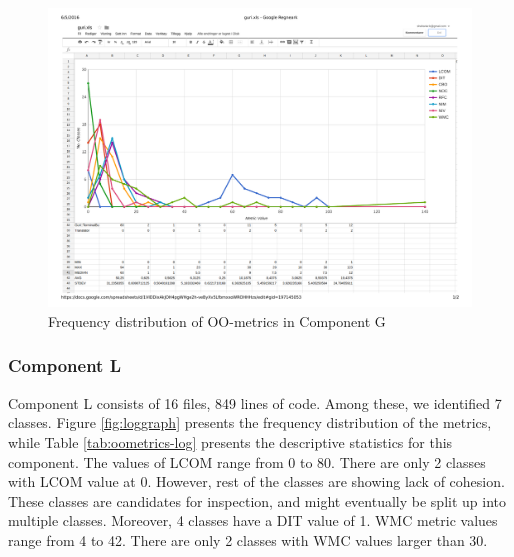 \begin{landscape}
\setlength\LTleft{-.5in}
	\begin{figure}
	\centering
	\includegraphics[width=\textwidth]{images/pdf/guri.pdf}
	\caption{Frequency distribution of OO-metrics in Component G}
	\label{fig:gurigraph}
	\end{figure}
\end{landscape}





\subsubsection{Component L}
Component L consists of 16 files, 849 lines of code. Among these, we identified 7 classes. Figure \ref{fig:loggraph} presents the frequency distribution of the metrics, while Table \ref{tab:oometrics-log} presents the descriptive statistics for this component. The values of LCOM range from 0 to 80. There are only 2 classes with LCOM value at 0. However, rest of the classes are showing lack of cohesion. These classes are candidates for inspection, and might eventually be split up into multiple classes. Moreover, 4 classes have a DIT value of 1. WMC metric values range from 4 to 42. There are only 2 classes with WMC values larger than 30.

